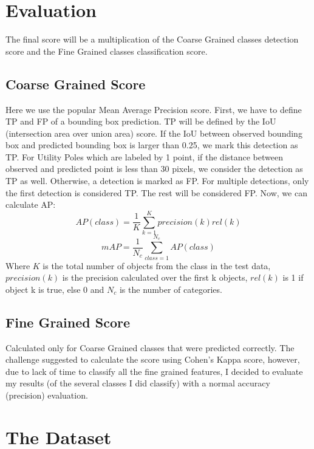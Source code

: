 \documentclass[]{article}
\begin{document}
\section{Evaluation}
The final score will be a multiplication of the Coarse Grained classes detection score and the Fine Grained classes classification score.

\subsection{Coarse Grained Score}
Here we use the popular Mean Average Precision score. First, we have to define TP and FP of a bounding box prediction. TP will be defined by the IoU (intersection area over union area) score. If the IoU between observed bounding box and predicted bounding box is larger than 0.25, we mark this detection as TP. For Utility Poles which are labeled by 1 point, if the distance between observed and predicted point is less than 30 pixels, we consider the detection as TP as well. Otherwise, a detection is marked as FP. For multiple detections, only the first detection is considered TP. The rest will be considered FP. Now, we can calculate AP:\\
$$AP(class)=\frac{1}{K}\sum_{k=1}^{K}precision(k)rel(k)$$
$$mAP=\frac{1}{N_c}\sum_{class=1}^{N_c}AP(class)$$
Where $K$ is the total number of objects from the class in the test data, $precision(k)$ is the precision calculated over the first k objects, $rel(k)$ is 1 if object k is true, else 0 and $N_c$ is the number of categories.

\subsection{Fine Grained Score}
Calculated only for Coarse Grained classes that were predicted correctly.
The challenge suggested to calculate the score using Cohen's Kappa score, however, due to lack of time to classify all the fine grained features, I decided to evaluate my results (of the several classes I did classify) with a normal accuracy (precision) evaluation.

\section{The Dataset}
\end{document}
